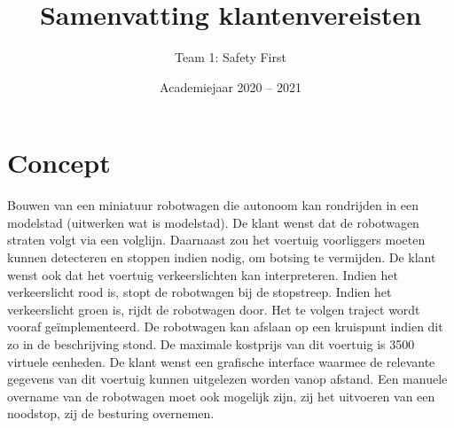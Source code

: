 \documentclass[a4paper,kulak]{kulakarticle} %
\date{Academiejaar 2020 -- 2021}
\title{Samenvatting klantenvereisten}
\author{Team 1: Safety First}
\begin{document}
\maketitle

\section{Concept}

Bouwen van een miniatuur robotwagen die autonoom kan rondrijden in een modelstad (uitwerken wat is modelstad). De klant wenst dat de robotwagen straten volgt via een volglijn. Daarnaast zou het voertuig voorliggers moeten kunnen detecteren en stoppen indien nodig, om botsing te vermijden. De klant wenst ook dat het voertuig verkeerslichten kan interpreteren. Indien het verkeerslicht rood is, stopt de robotwagen bij de stopstreep. Indien het verkeerslicht groen is, rijdt de robotwagen door.  Het te volgen traject wordt vooraf geïmplementeerd. De robotwagen kan afslaan op een kruispunt indien dit zo in de beschrijving stond. De maximale kostprijs van dit voertuig is 3500 virtuele eenheden. De klant wenst een grafische interface waarmee de relevante gegevens van dit voertuig kunnen uitgelezen worden vanop afstand. Een manuele overname van de robotwagen moet ook mogelijk zijn, zij het uitvoeren van een noodstop, zij de besturing overnemen.
\end{document}
